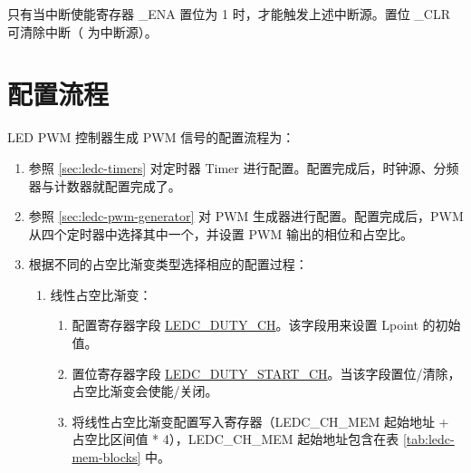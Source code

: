 \documentclass[main\_\_CN.tex]{subfiles}
\begin{document}
只有当中断使能寄存器 \_ENA 置位为 1 时，才能触发上述中断源。置位 \_CLR 可清除中断（ 为中断源）。


\section{配置流程}
\label{sec:ledc-prog-procedures}

LED PWM 控制器生成 PWM 信号的配置流程为：
\begin{enumerate}
    \item 参照 \ref{sec:ledc-timers} 对定时器 Timer 进行配置。配置完成后，时钟源、分频器与计数器就配置完成了。
    \item 参照 \ref{sec:ledc-pwm-generator} 对 PWM 生成器进行配置。配置完成后，PWM 从四个定时器中选择其中一个，并设置 PWM 输出的相位和占空比。
    \item 根据不同的占空比渐变类型选择相应的配置过程：
    \begin{enumerate}
    \item 线性占空比渐变：
    \begin{enumerate}
    \item 配置寄存器字段 \hyperref[fielddesc:LEDCDUTYCHN]{LEDC\_DUTY\_CH}。该字段用来设置 Lpoint 的初始值。
    \item 置位寄存器字段 \hyperref[fielddesc:LEDCDUTYSTARTCHN]{LEDC\_DUTY\_START\_CH}。当该字段置位/清除，占空比渐变会使能/关闭。
    \item 将线性占空比渐变配置写入寄存器（LEDC\_CH\_MEM 起始地址 + 占空比区间值 * 4），LEDC\_CH\_MEM 起始地址包含在表 \ref{tab:ledc-mem-blocks} 中。


\end{enumerate}
\end{enumerate}
\end{enumerate}
\end{document}
